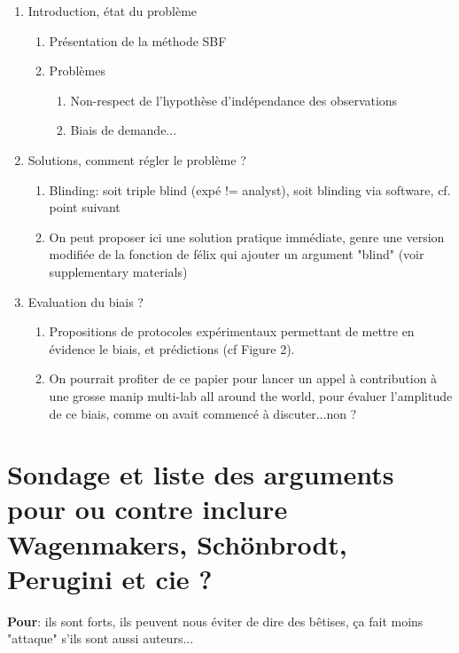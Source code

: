 \documentclass[a4paper,man,natbib,floatsintext]{apa6}
\begin{document}
\renewcommand{\labelenumii}{\Roman{enumii}}
\begin{enumerate}
	\item{Introduction, état du problème}
	\begin{enumerate}
		\item{Présentation de la méthode SBF}
		\item{Problèmes}
			\begin{enumerate}
            \item{Non-respect de l'hypothèse d'indépendance des observations}
            \item{Biais de demande...}
            \end{enumerate}
            \end{enumerate}
            \item{Solutions, comment régler le problème ?}
            \begin{enumerate}
            \item{Blinding: soit triple blind (expé != analyst), soit blinding via software, cf. point suivant}
            \item{On peut proposer ici une solution pratique immédiate, genre une version modifiée de la fonction de félix qui ajouter un argument "blind" (voir supplementary materials)}
            \end{enumerate}
            \item{Evaluation du biais ?}
            \begin{enumerate}
            \item{Propositions de protocoles expérimentaux permettant de mettre en évidence le biais, et prédictions (cf Figure 2).}
            \item{On pourrait profiter de ce papier pour lancer un appel à contribution à une grosse manip multi-lab all around the world, pour évaluer l'amplitude de ce biais, comme on avait commencé à discuter...non ?}

\end{enumerate}
\end{enumerate}


\section{Sondage et liste des arguments pour ou contre inclure Wagenmakers, Schönbrodt, Perugini et cie ?}

\textbf{Pour}: ils sont forts, ils peuvent nous éviter de dire des bêtises, ça fait moins "attaque" s'ils sont aussi auteurs...
\end{document}
